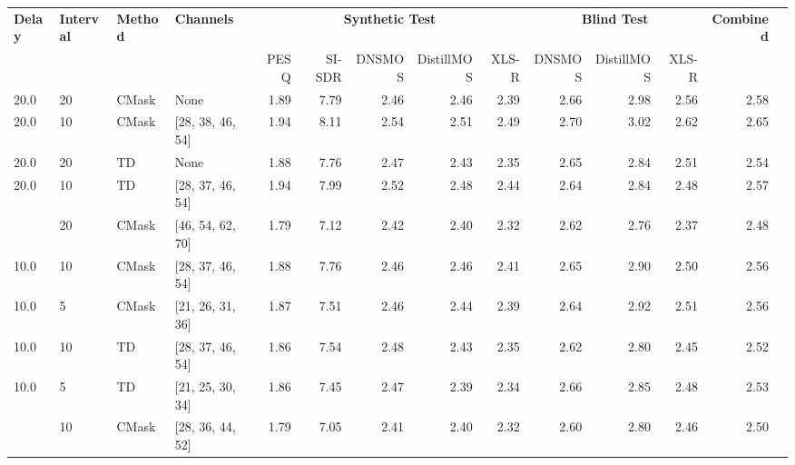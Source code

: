 \begin{tabular}{llllrrrrrrrrrr}
\toprule
\textbf{Delay} & \textbf{Interval} & \textbf{Method} & \textbf{Channels} & \multicolumn{5}{c}{\textbf{Synthetic Test}} & \multicolumn{3}{c}{\textbf{Blind Test}} & \textbf{Combined} \\
 &  &  &  & PESQ & SI-SDR & DNSMOS & DistillMOS & XLS-R & DNSMOS & DistillMOS & XLS-R &  \\
\midrule
20.0 & 20 & CMask & None & 1.89 & 7.79 & 2.46 & 2.46 & 2.39 & 2.66 & 2.98 & 2.56 & 2.58 \\
20.0 & 10 & CMask & [28, 38, 46, 54] & \cellcolor{green!20}1.94 & \cellcolor{green!20}8.11 & \cellcolor{green!20}2.54 & \cellcolor{green!20}2.51 & \cellcolor{green!20}2.49 & \cellcolor{green!20}2.70 & \cellcolor{green!20}3.02 & \cellcolor{green!20}2.62 & \cellcolor{green!50}2.65 \\
20.0 & 20 & TD & None & 1.88 & 7.76 & 2.47 & 2.43 & 2.35 & \cellcolor{green!20}2.65 & \cellcolor{green!20}2.84 & \cellcolor{green!20}2.51 & 2.54 \\
20.0 & 10 & TD & [28, 37, 46, 54] & \cellcolor{green!20}1.94 & \cellcolor{green!20}7.99 & \cellcolor{green!20}2.52 & \cellcolor{green!20}2.48 & \cellcolor{green!20}2.44 & 2.64 & 2.84 & 2.48 & \cellcolor{green!50}2.57 \\
\hdashline
\midrule
10.0 & 20 & CMask & [46, 54, 62, 70] & 1.79 & 7.12 & 2.42 & 2.40 & 2.32 & 2.62 & 2.76 & 2.37 & 2.48 \\
10.0 & 10 & CMask & [28, 37, 46, 54] & \cellcolor{green!20}1.88 & \cellcolor{green!20}7.76 & 2.46 & \cellcolor{green!20}2.46 & \cellcolor{green!20}2.41 & \cellcolor{green!20}2.65 & 2.90 & 2.50 & \cellcolor{green!50}2.56 \\
10.0 & 5 & CMask & [21, 26, 31, 36] & 1.87 & 7.51 & \cellcolor{green!20}2.46 & 2.44 & 2.39 & 2.64 & \cellcolor{green!20}2.92 & \cellcolor{green!20}2.51 & 2.56 \\
10.0 & 10 & TD & [28, 37, 46, 54] & \cellcolor{green!20}1.86 & \cellcolor{green!20}7.54 & \cellcolor{green!20}2.48 & \cellcolor{green!20}2.43 & \cellcolor{green!20}2.35 & 2.62 & 2.80 & 2.45 & 2.52 \\
10.0 & 5 & TD & [21, 25, 30, 34] & 1.86 & 7.45 & 2.47 & 2.39 & 2.34 & \cellcolor{green!20}2.66 & \cellcolor{green!20}2.85 & \cellcolor{green!20}2.48 & \cellcolor{green!50}2.53 \\
\hdashline
\midrule
5.0 & 10 & CMask & [28, 36, 44, 52] & 1.79 & 7.05 & 2.41 & \cellcolor{green!20}2.40 & \cellcolor{green!20}2.32 & 2.60 & \cellcolor{green!20}2.80 & \cellcolor{green!20}2.46 & \cellcolor{green!50}2.50 \\

\end{tabular}
